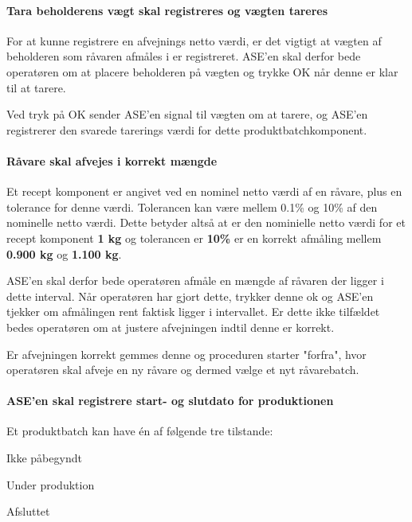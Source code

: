 \documentclass[a4paper]{article}
\newenvironment{my_itemize}
{\begin{itemize}
  \setlength{\itemsep}{1pt}
  \setlength{\parskip}{0pt}
  \setlength{\parsep}{0pt}}
{\end{itemize}}
\begin{document}

\paragraph{Tara beholderens vægt skal registreres og vægten tareres} %

For at kunne registrere en afvejnings netto værdi, er det vigtigt at vægten af beholderen som råvaren afmåles i er registreret. ASE'en skal derfor bede operatøren om at placere beholderen på vægten og trykke OK når denne er klar til at tarere.

Ved tryk på OK sender ASE'en signal til vægten om at tarere, og ASE'en registrerer den svarede tarerings værdi for dette produktbatchkomponent.


\paragraph{Råvare skal afvejes i korrekt mængde} %

Et recept komponent er angivet ved en nominel netto værdi af en råvare, plus en tolerance for denne værdi. Tolerancen kan være mellem 0.1\% og 10\% af den nominelle netto værdi. Dette betyder altså at er den nominielle netto værdi for et recept komponent \textbf{1 kg} og tolerancen er \textbf{10\%} er en korrekt afmåling mellem \textbf{0.900 kg} og \textbf{1.100 kg}.

ASE'en skal derfor bede operatøren afmåle en mængde af råvaren der ligger i dette interval. Når operatøren har gjort dette, trykker denne ok og ASE'en tjekker om afmålingen rent faktisk ligger i intervallet. Er dette ikke tilfældet bedes operatøren om at justere afvejningen indtil denne er korrekt.

Er afvejningen korrekt gemmes denne og proceduren starter "forfra", hvor operatøren skal afveje en ny råvare og dermed vælge et nyt råvarebatch.


\paragraph{ASE'en skal registrere start- og slutdato for produktionen} %

Et produktbatch kan have én af følgende tre tilstande:
\begin{my_itemize}
  \item Ikke påbegyndt
  \item Under produktion
  \item Afsluttet
\end{my_itemize}
\end{document}
